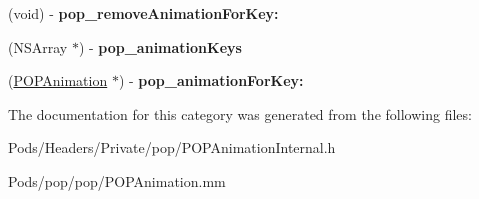 \begin{DoxyCompactItemize}
(void) -\/ {\bfseries pop\+\_\+remove\+Animation\+For\+Key\+:}
\item 
\mbox{\label{category_n_s_proxy_07_p_o_p_08_a4da73acf7d58056df8190dc43cc9f92f}} 
(N\+S\+Array $\ast$) -\/ {\bfseries pop\+\_\+animation\+Keys}
\item 
\mbox{\label{category_n_s_proxy_07_p_o_p_08_a2ec596f1b0fab96edc608f0e8066d1ac}} 
(\mbox{\hyperlink{interface_p_o_p_animation}{P\+O\+P\+Animation}} $\ast$) -\/ {\bfseries pop\+\_\+animation\+For\+Key\+:}
\end{DoxyCompactItemize}


The documentation for this category was generated from the following files\+:\begin{DoxyCompactItemize}
\item 
Pods/\+Headers/\+Private/pop/P\+O\+P\+Animation\+Internal.\+h\item 
Pods/pop/pop/P\+O\+P\+Animation.\+mm\end{DoxyCompactItemize}

